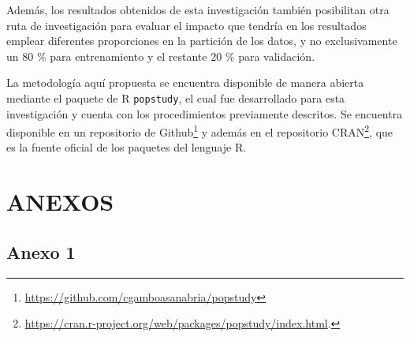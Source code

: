 \documentclass[
]{article}
\begin{document}
Además, los resultados obtenidos de esta investigación también
posibilitan otra ruta de investigación para evaluar el impacto que
tendría en los resultados emplear diferentes proporciones en la
partición de los datos, y no exclusivamente un 80 \% para entrenamiento
y el restante 20 \% para validación.

La metodología aquí propuesta se encuentra disponible de manera abierta
mediante el paquete de R \texttt{popstudy}, el cual fue desarrollado
para esta investigación y cuenta con los procedimientos previamente
descritos. Se encuentra disponible en un repositorio de
Github\footnote{\url{https://github.com/cgamboasanabria/popstudy}} y
además en el repositorio CRAN\footnote{\url{https://cran.r-project.org/web/packages/popstudy/index.html}.},
que es la fuente oficial de los paquetes del lenguaje R.

\newpage

\section{ANEXOS}


\label{chap:anexos}

\subsection{Anexo 1}

\begin{table}[!h]

\caption{\label{tab:unnamed-chunk-40}\label{tab:tiempos_estimacion}Tiempos de estimación en minutos para cada modelo según su tipo de estimación \textcolor{white}{prueba de aaaaaaaaaaaaaaaaaaaaaaa}}
\centering
{}
\end{table}
\end{document}
